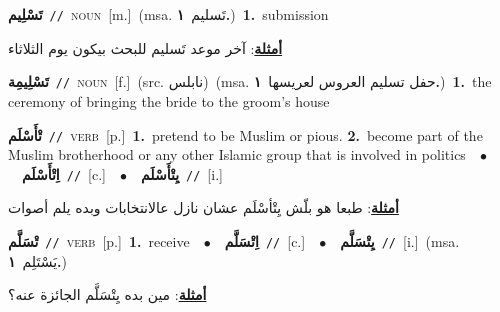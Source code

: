 \documentclass[10pt,a4paper,twoside]{article} %
\begin{document}
\begin{multicols}{2}
{\setlength\topsep{0pt}\textbf{\foreignlanguage{arabic}{تَسْلِيم}}\ {\color{gray}\texttt{//}\color{black}}\ \textsc{noun}\ [m.]\ \color{gray}(msa. \foreignlanguage{arabic}{تَسليم}~\foreignlanguage{arabic}{\textbf{١.}})\color{black}\ \textbf{1.}~submission\  \begin{flushright}\color{gray}\foreignlanguage{arabic}{\textbf{\underline{\foreignlanguage{arabic}{أمثلة}}}: آخر موعد تَسليم للبحث بيكون يوم الثلاثاء}\end{flushright}\color{black}} \vspace{2mm}

{\setlength\topsep{0pt}\textbf{\foreignlanguage{arabic}{تَسْلِيمِة}}\ {\color{gray}\texttt{//}\color{black}}\ \textsc{noun}\ [f.]\ (src. \color{gray}\foreignlanguage{arabic}{نابلس}\color{black})\ \color{gray}(msa. \foreignlanguage{arabic}{حفل تسليم العروس لعريسها}~\foreignlanguage{arabic}{\textbf{١.}})\color{black}\ \textbf{1.}~the ceremony of bringing the bride to the groom's house\ } \vspace{2mm}

{\setlength\topsep{0pt}\textbf{\foreignlanguage{arabic}{تْأَسْلَم}}\ {\color{gray}\texttt{//}\color{black}}\ \textsc{verb}\ [p.]\ \textbf{1.}~pretend to be Muslim or pious.  \textbf{2.}~become part of the Muslim brotherhood or any other Islamic group that is involved in politics\ \ $\bullet$\ \ \setlength\topsep{0pt}\textbf{\foreignlanguage{arabic}{اِتْأَسْلَم}}\ {\color{gray}\texttt{//}\color{black}}\ [c.]\ \ $\bullet$\ \ \setlength\topsep{0pt}\textbf{\foreignlanguage{arabic}{يِتْأَسْلَم}}\ {\color{gray}\texttt{//}\color{black}}\ [i.]\  \begin{flushright}\color{gray}\foreignlanguage{arabic}{\textbf{\underline{\foreignlanguage{arabic}{أمثلة}}}: طبعا هو بلّش يِتْأسْلَم عشان نازل عالانتخابات وبده يلم أصوات}\end{flushright}\color{black}} \vspace{2mm}

{\setlength\topsep{0pt}\textbf{\foreignlanguage{arabic}{تْسَلَّم}}\ {\color{gray}\texttt{//}\color{black}}\ \textsc{verb}\ [p.]\ \textbf{1.}~receive\ \ $\bullet$\ \ \setlength\topsep{0pt}\textbf{\foreignlanguage{arabic}{اِتْسَلَّم}}\ {\color{gray}\texttt{//}\color{black}}\ [c.]\ \ $\bullet$\ \ \setlength\topsep{0pt}\textbf{\foreignlanguage{arabic}{يِتْسَلَّم}}\ {\color{gray}\texttt{//}\color{black}}\ [i.]\ \color{gray}(msa. \foreignlanguage{arabic}{يَسْتَلِم}~\foreignlanguage{arabic}{\textbf{١.}})\color{black}\  \begin{flushright}\color{gray}\foreignlanguage{arabic}{\textbf{\underline{\foreignlanguage{arabic}{أمثلة}}}: مين بده يِتْسَلَّم الجائزة عنه؟}\end{flushright}\color{black}} \vspace{2mm}


\end{multicols}
\end{document}
